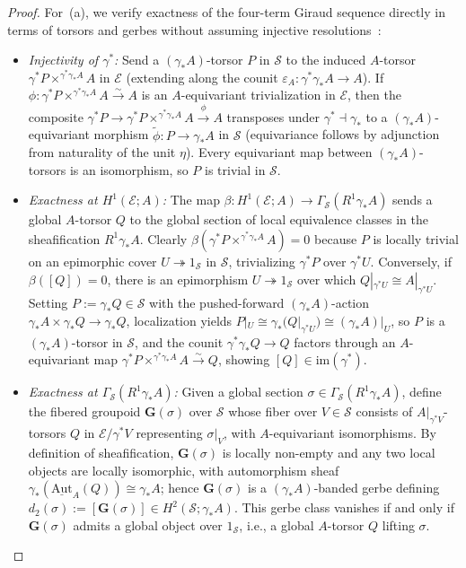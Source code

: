 \begin{proof}
For~(a), we verify exactness of the four-term Giraud sequence directly in terms of torsors and gerbes without assuming injective resolutions~\cite[Ch.~V, \S 3]{Giraud71}:
\begin{itemize}
  \item \emph{Injectivity of $\gamma^*$:} Send a $(\gamma_* A)$-torsor $P$ in $\mathcal{S}$ to the induced $A$-torsor $\gamma^* P \times^{\gamma^*\gamma_* A} A$ in $\mathcal{E}$ (extending along the counit $\varepsilon_A : \gamma^*\gamma_* A \to A$). If $\phi : \gamma^* P \times^{\gamma^*\gamma_* A} A \xrightarrow{\sim} A$ is an $A$-equivariant trivialization in $\mathcal{E}$, then the composite $\gamma^* P \to \gamma^* P \times^{\gamma^*\gamma_* A} A \xrightarrow{\phi} A$ transposes under $\gamma^* \dashv \gamma_*$ to a $(\gamma_* A)$-equivariant morphism $\tilde{\phi} : P \to \gamma_* A$ in $\mathcal{S}$ (equivariance follows by adjunction from naturality of the unit $\eta$). Every equivariant map between $(\gamma_* A)$-torsors is an isomorphism, so $P$ is trivial in $\mathcal{S}$.
  \item \emph{Exactness at $H^1(\mathcal{E}; A)$:} The map $\beta : H^1(\mathcal{E}; A) \to \Gamma_{\mathcal{S}}(R^1\gamma_* A)$ sends a global $A$-torsor $Q$ to the global section of local equivalence classes in the sheafification $R^1\gamma_* A$. Clearly $\beta(\gamma^* P \times^{\gamma^*\gamma_* A} A) = 0$ because $P$ is locally trivial on an epimorphic cover $U \twoheadrightarrow 1_{\mathcal{S}}$ in $\mathcal{S}$, trivializing $\gamma^* P$ over $\gamma^* U$. Conversely, if $\beta([Q]) = 0$, there is an epimorphism $U \twoheadrightarrow 1_{\mathcal{S}}$ over which $Q|_{\gamma^* U} \cong A|_{\gamma^* U}$. Setting $P := \gamma_* Q \in \mathcal{S}$ with the pushed-forward $(\gamma_* A)$-action $\gamma_* A \times \gamma_* Q \to \gamma_* Q$, localization yields $P|_U \cong \gamma_*(Q|_{\gamma^* U}) \cong (\gamma_* A)|_U$, so $P$ is a $(\gamma_* A)$-torsor in $\mathcal{S}$, and the counit $\gamma^* \gamma_* Q \to Q$ factors through an $A$-equivariant map $\gamma^* P \times^{\gamma^*\gamma_* A} A \xrightarrow{\sim} Q$, showing $[Q] \in \mathrm{im}(\gamma^*)$.
  \item \emph{Exactness at $\Gamma_{\mathcal{S}}(R^1\gamma_* A)$:} Given a global section $\sigma \in \Gamma_{\mathcal{S}}(R^1\gamma_* A)$, define the fibered groupoid $\mathbf{G}(\sigma)$ over $\mathcal{S}$ whose fiber over $V \in \mathcal{S}$ consists of $A|_{\gamma^* V}$-torsors $Q$ in $\mathcal{E}/\gamma^* V$ representing $\sigma|_V$, with $A$-equivariant isomorphisms. By definition of sheafification, $\mathbf{G}(\sigma)$ is locally non-empty and any two local objects are locally isomorphic, with automorphism sheaf $\gamma_*(\underline{\mathrm{Aut}}_A(Q)) \cong \gamma_* A$; hence $\mathbf{G}(\sigma)$ is a $(\gamma_* A)$-banded gerbe defining $d_2(\sigma) := [\mathbf{G}(\sigma)] \in H^2(\mathcal{S}; \gamma_* A)$. This gerbe class vanishes if and only if $\mathbf{G}(\sigma)$ admits a global object over $1_{\mathcal{S}}$, i.e., a global $A$-torsor $Q$ lifting $\sigma$.

\end{itemize}
\end{proof}
